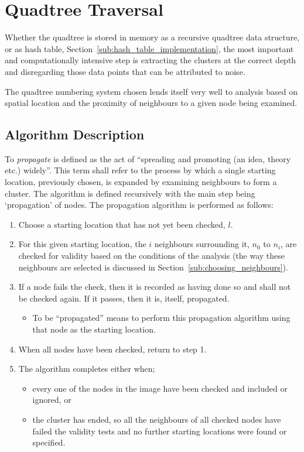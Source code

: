 
\section{Quadtree Traversal}
\label{sec:quadtree_traversal}

Whether the quadtree is stored in memory as a recursive quadtree data
structure, or as hash table, Section~\ref{sub:hash_table_implementation}, the
most important and computationally intensive step is extracting the clusters at
the correct depth and disregarding those data points that can be attributed to
noise.

The quadtree numbering system chosen lends itself very well to analysis based
on spatial location and the proximity of neighbours to a given node being
examined.

\subsection{Algorithm Description}
\label{sub:algorithm_description}

To \emph{propagate} is defined as the act of ``spreading and promoting (an
idea, theory etc.) widely''\cite{oed31}. This term shall refer to the process
by which a single starting location, previously chosen, is expanded by
examining neighbours to form a cluster. The algorithm is defined recursively
with the main step being `propagation' of nodes. The propagation algorithm is
performed as follows:

\begin{enumerate}
	\item Choose a starting location that has not yet been checked, $l$.
	\item For this given starting location, the $i$ neighbours surrounding it,
		$n_0$ to $n_i$, are checked for validity based on the conditions of the
		analysis (the way these neighbours are selected is discussed in
		Section~\ref{sub:choosing_neighbours}).
	\item If a node fails the check, then it is recorded as having done so and
		shall not be checked again. If it passes, then it is, itself,
		propagated.
		\begin{itemize}
			\item To be ``propagated'' means to perform this propagation
				algorithm using that node as the starting location.
		\end{itemize}
	\item When all nodes have been checked, return to step 1.
	\item The algorithm completes either when;
	\begin{itemize}
		\item every one of the nodes in the image have been checked and
			included or ignored, or
		\item the cluster has ended, so all the neighbours of all checked nodes
			have failed the validity tests and no further starting locations
			were found or specified.
	\end{itemize}
\end{enumerate}

